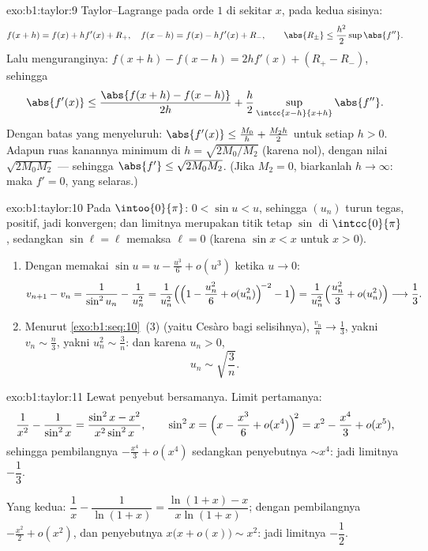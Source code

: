 \begin{solution}{exo:b1:taylor:9}
Taylor--Lagrange pada orde $1$ di sekitar $x$, pada kedua sisinya:
\[
f(x + h) = f(x) + h f'(x) + R_+,\quad
f(x - h) = f(x) - h f'(x) + R_-,
\qquad \abs{R_\pm} \leq \frac{h^2}{2} \sup \abs{f''} .
\]
Lalu menguranginya: $f(x+h) - f(x-h) = 2h f'(x) + (R_+ - R_-)$, sehingga
\[
\abs{f'(x)} \leq \frac{\abs{f(x+h) - f(x-h)}}{2h} +
\frac{h}{2}\sup_{\intcc{x-h}{x+h}}\abs{f''} .
\]
Dengan batas yang menyeluruh: $\abs{f'(x)} \leq \frac{M_0}{h} + \frac{M_2
h}{2}$ untuk setiap $h > 0$. Adapun ruas kanannya minimum di $h =
\sqrt{2M_0/M_2}$ (karena  nol), dengan nilai $\sqrt{2M_0M_2}$
--- sehingga $\abs{f'} \leq \sqrt{2M_0M_2}$. (Jika $M_2 = 0$, biarkanlah $h \to
\infty$: maka $f' = 0$, yang selaras.)
\end{solution}

\begin{solution}{exo:b1:taylor:10}
Pada $\intoo{0}{\pi}$: $0 < \sin u < u$, sehingga $(u_n)$ turun
tegas, positif, jadi konvergen; dan limitnya merupakan titik tetap
$\sin$ di $\intcc{0}{\pi}$, sedangkan $\sin \ell = \ell$ memaksa $\ell =
0$ (karena $\sin x < x$ untuk $x > 0$).
\begin{enumerate}
  \item Dengan memakai $\sin u = u - \frac{u^3}{6} + o(u^3)$ ketika $u \to 0$:
        \[
        v_{n+1} - v_n = \frac{1}{\sin^2 u_n} - \frac{1}{u_n^2}
        = \frac{1}{u_n^2}\Bigl(\Bigl(1 - \frac{u_n^2}{6} +
        o(u_n^2)\Bigr)^{\!-2} - 1\Bigr)
        = \frac{1}{u_n^2}\Bigl(\frac{u_n^2}{3} + o(u_n^2)\Bigr)
        \longrightarrow \frac13 .
        \]
  \item Menurut \cref{exo:b1:seq:10}~(3) (yaitu Cesàro bagi selisihnya),
        $\frac{v_n}{n} \to \frac13$, yakni $v_n \sim \frac n3$, yakni
        $u_n^2 \sim \frac 3n$: dan karena $u_n > 0$,
        \[
        u_n \sim \sqrt{\frac{3}{n}} .
        \]
\end{enumerate}
\end{solution}

\begin{solution}{exo:b1:taylor:11}
Lewat penyebut bersamanya. Limit pertamanya:
\[
\frac{1}{x^2} - \frac{1}{\sin^2 x}
= \frac{\sin^2 x - x^2}{x^2\sin^2 x},
\qquad
\sin^2 x = \Bigl(x - \frac{x^3}{6} + o(x^4)\Bigr)^{\!2}
= x^2 - \frac{x^4}{3} + o(x^5) ,
\]
sehingga pembilangnya $-\frac{x^4}{3} + o(x^4)$ sedangkan
penyebutnya $\sim x^4$: jadi limitnya $-\dfrac13$.

Yang kedua: $\dfrac1x - \dfrac{1}{\ln(1+x)} = \dfrac{\ln(1+x) -
x}{x\ln(1+x)}$; dengan pembilangnya $-\frac{x^2}{2} + o(x^2)$, dan
penyebutnya $x\bigl(x + o(x)\bigr) \sim x^2$: jadi limitnya
$-\dfrac12$.
\end{solution}

